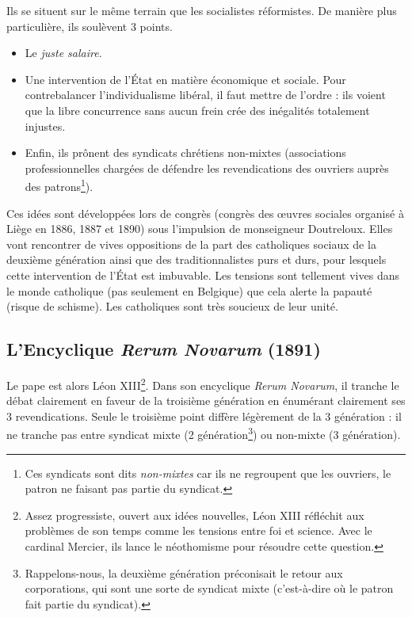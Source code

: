 \documentclass[12pt]{report}
\begin{document}
Ils se situent sur le même terrain que les socialistes réformistes.
De manière plus particulière, ils soulèvent 3 points.

\begin{itemize}
	\item Le \emph{juste salaire}.
	\item Une intervention de l'État en matière économique et sociale. Pour contrebalancer l'individualisme libéral, il faut mettre de l'ordre : ils voient que la libre concurrence sans aucun frein crée des inégalités totalement injustes.
	\item Enfin, ils prônent des syndicats chrétiens non-mixtes (associations professionnelles chargées de défendre les revendications des ouvriers auprès des patrons\footnote{Ces syndicats sont dits \emph{non-mixtes} car ils ne regroupent que les ouvriers, le patron ne faisant pas partie du syndicat.}).
\end{itemize}

Ces idées sont développées lors de congrès (congrès des œuvres sociales organisé à Liège en 1886, 1887 et 1890) sous l'impulsion de monseigneur Doutreloux.
Elles vont rencontrer de vives oppositions de la part des catholiques sociaux de la deuxième génération ainsi que des traditionnalistes purs et durs, pour lesquels cette intervention de l'État est imbuvable.
Les tensions sont tellement vives dans le monde catholique (pas seulement en Belgique) que cela alerte la papauté (risque de schisme). Les catholiques sont très soucieux de leur unité.

\subsection{L'Encyclique \emph{Rerum Novarum} (1891)}

Le pape est alors Léon XIII\footnote{Assez progressiste, ouvert aux idées nouvelles, Léon XIII réfléchit aux problèmes de son temps comme les tensions entre foi et science. Avec le cardinal Mercier, ils lance le néothomisme pour résoudre cette question.}.
Dans son encyclique \emph{Rerum Novarum}, il tranche le débat clairement en faveur de la troisième génération en énumérant clairement ses 3 revendications.
Seule le troisième point diffère légèrement de la 3 génération : il ne tranche pas entre syndicat mixte (2 génération\footnote{Rappelons-nous, la deuxième génération préconisait le retour aux corporations, qui sont une sorte de syndicat mixte (c'est-à-dire où le patron fait partie du syndicat).}) ou non-mixte (3 génération).
\end{document}

